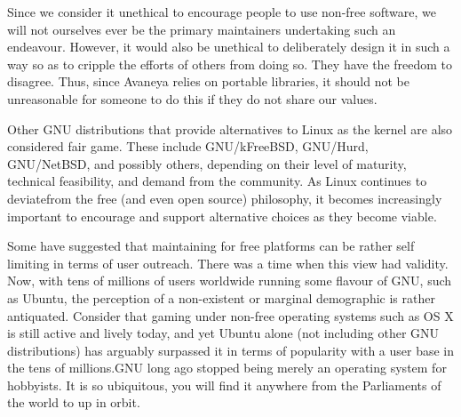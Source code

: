 Since we consider it unethical to encourage people to use non-free software, we will not ourselves ever be the primary maintainers undertaking such an endeavour. However, it would also be unethical to deliberately design it in such a way so as to cripple the efforts of others from doing so. They have the freedom to disagree. Thus, since Avaneya relies on portable libraries, it should not be unreasonable for someone to do this if they do not share our values.

Other GNU distributions that provide alternatives to Linux as the kernel are also considered fair game. These include GNU/kFreeBSD, GNU/Hurd, GNU/NetBSD, and possibly others, depending on their level of maturity, technical feasibility, and demand from the community. As Linux continues to deviate from the free (and even open source) philosophy, it becomes increasingly important to encourage and support alternative choices as they become viable.

Some have suggested that maintaining for free platforms can be rather self limiting in terms of user outreach. There was a time when this view had validity. Now, with tens of millions of users worldwide running some flavour of GNU, such as Ubuntu, the perception of a non-existent or marginal demographic  is rather antiquated. Consider that gaming under non-free operating systems such as OS X is still active and lively today, and yet Ubuntu alone (not including other GNU distributions) has arguably surpassed it in terms of popularity with a user base in the tens of millions. GNU long ago stopped being merely an operating system for hobbyists. It is so ubiquitous, you will find it anywhere from the Parliaments of the world to up in orbit.

\StopChapter

